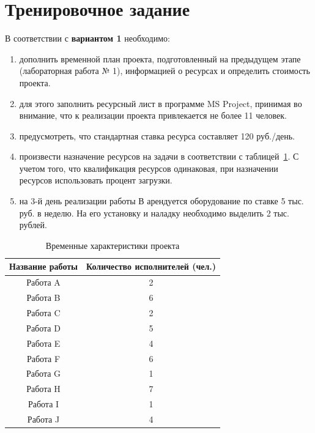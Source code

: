 \section*{Тренировочное задание}

В соответствии с \textbf{вариантом 1} необходимо:
\begin{enumerate}
    \item дополнить временной план проекта, подготовленный на предыдущем этапе
(лабораторная работа № 1), информацией о ресурсах и определить стоимость
проекта.
    \item для этого заполнить ресурсный лист в программе MS Project, принимая во
внимание, что к реализации проекта привлекается не более 11 человек.
    \item предусмотреть, что стандартная ставка ресурса составляет 120 руб./день.
    \item произвести назначение ресурсов на задачи в соответствии с таблицей~\ref{tbl:t_1}. С учетом
того, что квалификация ресурсов одинаковая, при назначении ресурсов
использовать процент загрузки.
    \item на 3-й день реализации работы В арендуется оборудование по ставке 5 тыс. руб.
в неделю. На его установку и наладку необходимо выделить 2 тыс. рублей.
\end{enumerate}

\captionsetup{justification=raggedright,singlelinecheck=off}
\begin{table}[h]
    \caption{\label{tbl:t_1}Временные характеристики проекта}
    \begin{center}
        \begin{tabular}{|c|c|}
                    \hline
              \textbf{Название работы} & \textbf{Количество исполнителей (чел.)}            \\ \hline
            Работа A  & 2    \\ \hline
            Работа B & 6    \\ \hline
            Работа C  & 2    \\ \hline
            Работа D  & 5    \\ \hline
            Работа E  & 4    \\ \hline
            Работа F  & 6    \\ \hline
            Работа G  & 1    \\ \hline
            Работа H  & 7    \\ \hline
            Работа I  & 1    \\ \hline
            Работа J  & 4    \\ \hline
            \end{tabular}
    \end{center}
\end{table}

